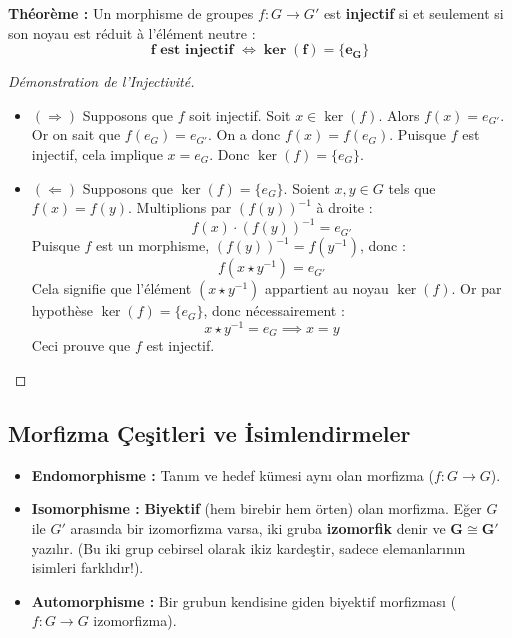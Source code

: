 \documentclass[12pt,a4paper]{report}
\begin{document}
\vspace{0.4cm}

\begin{tcolorbox}[colback=purple!5!white,colframe=purple!75!black,title=En Kritik Sınav Teoremi : Birebirlik Testi (Injectivité)]
\textbf{Théorème :} Un morphisme de groupes $f : G \to G'$ est \textbf{injectif} si et seulement si son noyau est réduit à l'élément neutre :
\[ \mathbf{f \text{ est injectif } \iff \ker(f) = \{e_G\}} \]
\end{tcolorbox}

\begin{proof}[Démonstration de l'Injectivité]
\begin{itemize}
    \item $(\Longrightarrow)$ Supposons que $f$ soit injectif.  
    Soit $x \in \ker(f)$. Alors $f(x) = e_{G'}$. Or on sait que $f(e_G) = e_{G'}$.  
    On a donc $f(x) = f(e_G)$. Puisque $f$ est injectif, cela implique $x = e_G$.  
    Donc $\ker(f) = \{e_G\}$.
    
    \item $(\Longleftarrow)$ Supposons que $\ker(f) = \{e_G\}$.  
    Soient $x, y \in G$ tels que $f(x) = f(y)$.  
    Multiplions par $(f(y))^{-1}$ à droite :  
    \[ f(x) \cdot (f(y))^{-1} = e_{G'} \]
    Puisque $f$ est un morphisme, $(f(y))^{-1} = f(y^{-1})$, donc :
    \[ f(x \star y^{-1}) = e_{G'} \]
    Cela signifie que l'élément $(x \star y^{-1})$ appartient au noyau $\ker(f)$.  
    Or par hypothèse $\ker(f) = \{e_G\}$, donc nécessairement :
    \[ x \star y^{-1} = e_G \implies x = y \]
    Ceci prouve que $f$ est injectif.
\end{itemize}
\end{proof}

\vspace{0.4cm}

\subsection*{Morfizma Çeşitleri ve İsimlendirmeler}
\begin{itemize}
    \item \textbf{Endomorphisme :} Tanım ve hedef kümesi aynı olan morfizma ($f : G \to G$).
    \item \textbf{Isomorphisme :} \textbf{Biyektif} (hem birebir hem örten) olan morfizma. Eğer $G$ ile $G'$ arasında bir izomorfizma varsa, iki gruba \textbf{izomorfik} denir ve $\mathbf{G \cong G'}$ yazılır. (Bu iki grup cebirsel olarak ikiz kardeştir, sadece elemanlarının isimleri farklıdır!).
    \item \textbf{Automorphisme :} Bir grubun kendisine giden biyektif morfizması ($f : G \to G$ izomorfizma).
\end{itemize}
\end{document}

